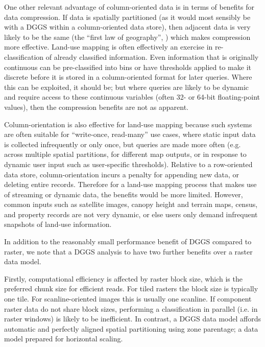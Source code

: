 \documentclass[]{interact}
\theoremstyle{plain}%
\theoremstyle{definition}
\theoremstyle{remark}
\begin{document}
One other relevant advantage of column-oriented data is in terms of benefits for data compression. If data is spatially partitioned (as it would most sensibly be with a \ac{DGGS} within a column-oriented data store), then adjacent data is very likely to be the same (the ``first law of geography'', \citet{tobler1970computer}) which makes compression more effective. Land-use mapping is often effectively an exercise in re-classification of already classified information. Even information that is originally continuous can be pre-classified into bins or have thresholds applied to make it discrete before it is stored in a column-oriented format for later queries. Where this can be exploited, it should be; but where queries are likely to be dynamic and require access to these continuous variables (often 32- or 64-bit floating-point values), then the compression benefits are not as apparent.

Column-orientation is also effective for land-use mapping because such systems are often suitable for ``write-once, read-many'' use cases, where static input data is collected infrequently or only once, but queries are made more often (e.g. across multiple spatial partitions, for different map outputs, or in response to dynamic user input such as user-specific thresholds). Relative to a row-oriented data store, column-orientation incurs a penalty for appending new data, or deleting entire records. Therefore for a land-use mapping process that makes use of streaming or dynamic data, the benefits would be more limited. However, common inputs such as satellite images, canopy height and terrain maps, census, and property records are not very dynamic, or else users only demand infrequent snapshots of land-use information.

In addition to the reasonably small performance benefit of \ac{DGGS} compared to raster, we note that a \ac{DGGS} analysis to have two further benefits over a raster data model.

Firstly, computational efficiency is affected by raster block size, which is the preferred chunk size for efficient reads. For tiled rasters the block size is typically one tile. For scanline-oriented images this is usually one scanline. If component raster data do not share block sizes, performing a classification in parallel (i.e. in raster windows) is likely to be inefficient. In contrast, a \ac{DGGS} data model affords automatic and perfectly aligned spatial partitioning using zone parentage; a data model prepared for horizontal scaling.
\end{document}
